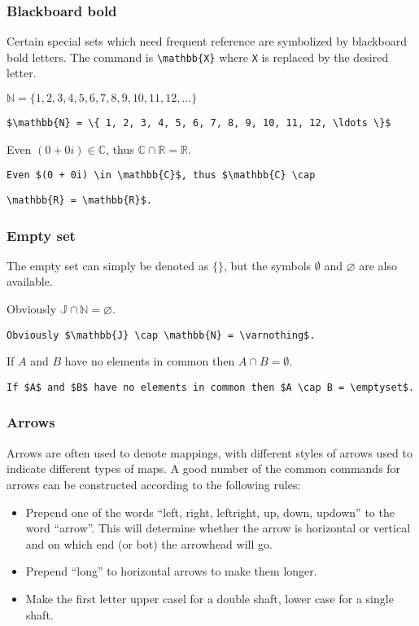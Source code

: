\bigskip

\subsubsection{Blackboard bold}

Certain special sets which need frequent reference are symbolized by blackboard bold letters. The command is \verb=\mathbb{X}= where \verb=X= is replaced by the desired letter.

\medskip

$\mathbb{N} = \{ 1, 2, 3, 4, 5, 6, 7, 8, 9, 10, 11, 12, \ldots \}$

\smallskip

\verb'$\mathbb{N} = \{ 1, 2, 3, 4, 5, 6, 7, 8, 9, 10, 11, 12, \ldots \}$'

\medskip

Even $(0 + 0i) \in \mathbb{C}$, thus $\mathbb{C} \cap \mathbb{R} = \mathbb{R}$.

\smallskip

\verb'Even $(0 + 0i) \in \mathbb{C}$, thus $\mathbb{C} \cap'

\verb'\mathbb{R} = \mathbb{R}$.'

\subsubsection{Empty set}

The empty set can simply be denoted as $\{ \}$, but the symbols $\emptyset$ and $\varnothing$ are also available.

\medskip

Obviously $\mathbb{J} \cap \mathbb{N} = \varnothing$.

\smallskip

\verb'Obviously $\mathbb{J} \cap \mathbb{N} = \varnothing$.'

\medskip

If $A$ and $B$ have no elements in common then $A \cap B = \emptyset$.

\smallskip

\verb'If $A$ and $B$ have no elements in common then $A \cap B = \emptyset$.'

\subsubsection{Arrows}

Arrows are often used to denote mappings, with different styles of arrows used to indicate different types of maps.  A good number of the common commands for arrows can be constructed according to the following rules:
\begin{itemize}
\item Prepend one of the words ``left, right, leftright, up, down, updown'' to the word
``arrow''.  This will determine whether the arrow is horizontal or vertical and on which end (or bot) the arrowhead will go.
\item Prepend ``long'' to horizontal arrows to make them longer.
\item Make the first letter upper casel for a double shaft, lower case for a single shaft.
\end{itemize}


